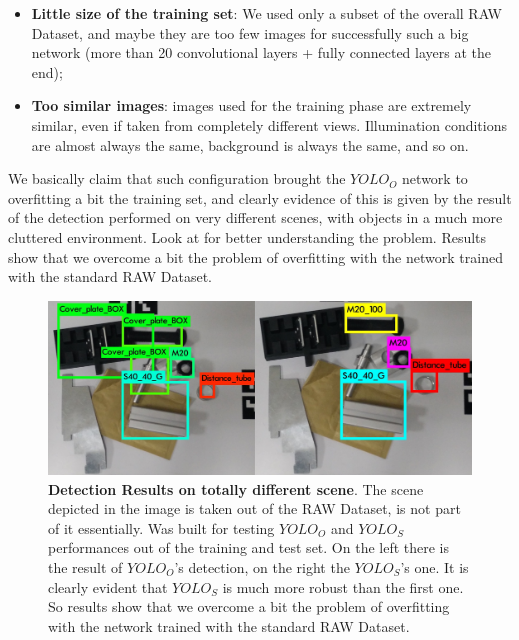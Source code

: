 \begin{itemize}
	\item \textbf{Little size of the training set}: We used only a subset of the overall RAW Dataset, and maybe they are too few images for successfully such a big network (more than 20 convolutional layers + fully connected layers at the end);
	\item \textbf{Too similar images}: images used for the training phase are extremely similar, even if taken from completely different views. Illumination conditions are almost always the same, background is always the same, and so on.
\end{itemize}

We basically claim that such configuration brought the $YOLO_O$ network to overfitting a bit the training set, and clearly evidence of this is given by the result of the detection performed on very different scenes, with objects in a much more cluttered environment. Look at  for better understanding the problem. Results show that we overcome a bit the problem of overfitting with the network trained with the standard RAW Dataset.

\begin{figure}
    \centering
    \includegraphics[width=\textwidth]{figures/4_experiments/overfitting_problem}
    \caption{\textbf{Detection Results on totally different scene}. The scene depicted in the image is taken out of the RAW Dataset, is not part of it essentially. Was built for testing $YOLO_O$ and $YOLO_S$ performances out of the training and test set. On the left there is the result of $YOLO_O$'s detection, on the right the $YOLO_S$'s one. It is clearly evident that $YOLO_S$ is much more robust than the first one. So results show that we overcome a bit the problem of overfitting with the network trained with the standard RAW Dataset.}
    \label{fig:overfitting_problem}
\end{figure}

